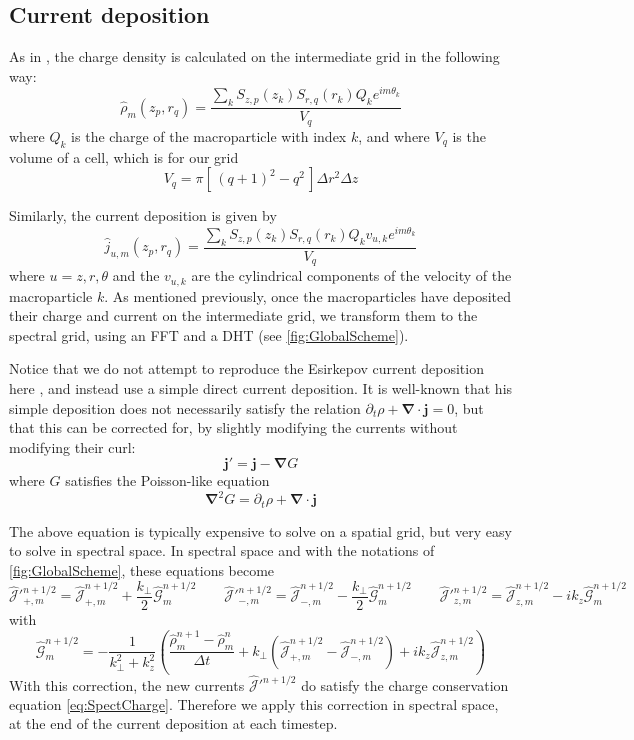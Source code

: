 \documentclass[a4paper]{article}   	%
\renewcommand{\vec}[1]{\boldsymbol{#1}}
\newcommand{\spectral}[1]{\hat{\mathcal{#1}}}
\begin{document}
\subsection{Current deposition}

As in \citep{Lifschitz}, the charge density is calculated on the intermediate grid in the
following way:
\[ \hat{\rho}_m(z_p,r_q) = \frac{ \sum_k  S_{z,p}(z_k)S_{r,q}(r_k) Q_k e^{im\theta_k}}{V_{q}} \]
where $Q_k$ is the charge of the macroparticle with index $k$, and
where $V_q$ is the volume of a cell, which is for our grid
\[ V_{q} = \pi [\, (q+1)^2- q^2\,] \Delta r^2 \Delta z \]

\noindent Similarly, the current deposition is given by
\[ \hat{j}_{u,m}(z_p,r_q) = \frac{\sum_k S_{z,p}(z_k) S_{r,q}(r_k)
Q_k v_{u,k} e^{im\theta_k}}{V_{q}} \]
where $u = z,r,\theta$ and the $v_{u,k}$ are the cylindrical components of the
velocity of the macroparticle $k$. As mentioned previously, once the
macroparticles have deposited their charge and current on the
intermediate grid, we transform them to the spectral grid, using an
FFT and a DHT (see \cref{fig:GlobalScheme}).

Notice that we do not attempt to
reproduce the Esirkepov current deposition here \citep{Esirkepov}, and instead use a
simple direct current deposition. It is well-known that his simple deposition does not necessarily
satisfy the relation $\partial_t\rho + \vec{\nabla}\cdot\vec{j} =
0$, but that this can be corrected for, by slightly modifying the
currents without modifying their curl:
\[ \vec{j}' = \vec{j} - \vec{\nabla} G \]
where $G$ satisfies the Poisson-like equation
\[ \vec{\nabla}^2 G = \partial_t\rho + \vec{\nabla}\cdot\vec{j} \]

The above equation is typically expensive to solve on a spatial grid, but
very easy to solve in spectral space. In spectral space and with the
notations of \cref{fig:GlobalScheme}, these equations become
\[ \spectral{J}'^{n+1/2}_{+,m} = \spectral{J}^{n+1/2}_{+,m} +
\frac{k_\perp}{2} \spectral{G}^{n+1/2}_m
\qquad
\spectral{J}'^{n+1/2}_{-,m} = \spectral{J}^{n+1/2}_{-,m} - \frac{k_\perp}{2} \spectral{G}^{n+1/2}_m
\qquad \spectral{J}'^{n+1/2}_{z,m} = \spectral{J}^{n+1/2}_{z,m} - ik_z
\spectral{G}^{n+1/2}_m\]
with
\[ \spectral{G}^{n+1/2}_m = - \frac{1}{k_\perp^2 + k_z^2}\left(
  \frac{\spectral{\rho}^{n+1}_m -\spectral{\rho}^{n}_m}{\Delta t} + k_\perp
  (\spectral{J}^{n+1/2}_{+,m} -\spectral{J}^{n+1/2}_{-,m}) + ik_z\spectral{J}^{n+1/2}_{z,m}  \right) \]
With this correction, the new currents $\spectral{J}'^{n+1/2}$ do satisfy
the charge conservation equation \cref{eq:SpectCharge}. Therefore we apply this
correction in spectral space, at the end of the current deposition at each timestep.
\end{document}
